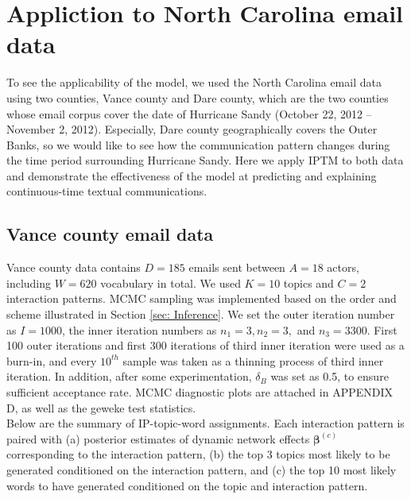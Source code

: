 \documentclass[a4paper]{article}
\begin{document}
 \section{Appliction to North Carolina email data}  \label{sec: Application to North Carolina email data}
 To see the applicability of the model, we used the North Carolina email data using two counties, Vance county and Dare county, which are the two counties whose email corpus cover the date of Hurricane Sandy (October 22, 2012 – November 2, 2012). Especially, Dare county geographically covers the Outer Banks, so we would like to see how the communication pattern changes during the time period surrounding Hurricane Sandy. Here we apply IPTM to both data and demonstrate the effectiveness of the model at predicting and explaining continuous-time textual communications.
 \subsection{Vance county email data} \label{subsec: Vance county email data}
Vance county data contains $D=185$ emails sent between $A=18$ actors, including $W=620$ vocabulary in total. We used $K=10$ topics and $C=2$ interaction patterns. MCMC sampling was implemented based on the order and scheme illustrated in Section \ref{sec: Inference}. We set the outer iteration number as $I=1000$, the inner iteration numbers as $n_1=3, n_2=3,$ and $n_3=3300$. First 100 outer iterations and first 300 iterations of third inner iteration were used as a burn-in, and every $10^{th}$ sample was taken as a thinning process of third inner iteration. In addition, after some experimentation, $\delta_B$ was set as 0.5, to ensure sufficient acceptance rate. MCMC diagnostic plots are attached in APPENDIX D, as well as the geweke test statistics. \\\newline
 Below are the summary of IP-topic-word assignments. Each interaction pattern is paired with (a) posterior estimates of dynamic network effects $\boldsymbol{\beta}^{(c)}$ corresponding to the interaction pattern, (b) the top 3 topics most likely to be generated conditioned on the interaction pattern, and (c) the top 10 most likely words to have generated conditioned on the topic and interaction pattern.
\end{document}
